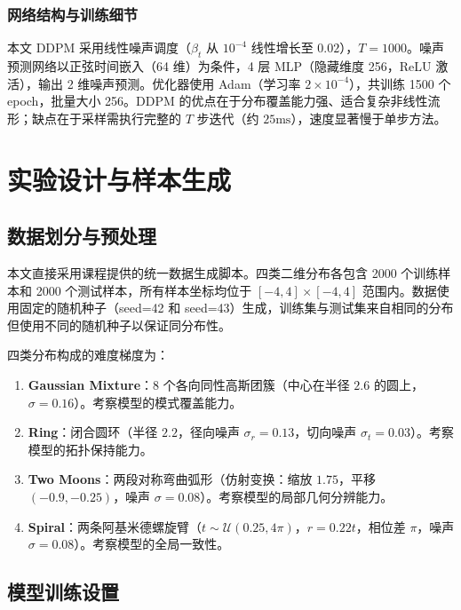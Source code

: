 \documentclass[10pt, a4paper, oneside]{ctexart}
\numberwithin{equation}{section}
\numberwithin{table}{section}
\numberwithin{figure}{section}
\begin{document}
\subsubsection{网络结构与训练细节}

本文 DDPM 采用线性噪声调度（$\beta_t$ 从 $10^{-4}$ 线性增长至 $0.02$），$T=1000$。噪声预测网络以正弦时间嵌入（64 维）为条件，4 层 MLP（隐藏维度 256，ReLU 激活），输出 2 维噪声预测。优化器使用 Adam（学习率 $2\times 10^{-4}$），共训练 1500 个 epoch，批量大小 256。DDPM 的优点在于分布覆盖能力强、适合复杂非线性流形；缺点在于采样需执行完整的 $T$ 步迭代（约 $25\mathrm{ms}$），速度显著慢于单步方法。

\section{实验设计与样本生成}

\subsection{数据划分与预处理}

本文直接采用课程提供的统一数据生成脚本。四类二维分布各包含 2000 个训练样本和 2000 个测试样本，所有样本坐标均位于 $[-4,4]\times[-4,4]$ 范围内。数据使用固定的随机种子（seed=42 和 seed=43）生成，训练集与测试集来自相同的分布但使用不同的随机种子以保证同分布性。

四类分布构成的难度梯度为：
\begin{enumerate}[label=(\arabic*)]
    \item \textbf{Gaussian Mixture}：8 个各向同性高斯团簇（中心在半径 $2.6$ 的圆上，$\sigma=0.16$）。考察模型的模式覆盖能力。
    \item \textbf{Ring}：闭合圆环（半径 $2.2$，径向噪声 $\sigma_r=0.13$，切向噪声 $\sigma_t=0.03$）。考察模型的拓扑保持能力。
    \item \textbf{Two Moons}：两段对称弯曲弧形（仿射变换：缩放 $1.75$，平移 $(-0.9,-0.25)$，噪声 $\sigma=0.08$）。考察模型的局部几何分辨能力。
    \item \textbf{Spiral}：两条阿基米德螺旋臂（$t\sim\mathcal{U}(0.25,4\pi)$，$r=0.22t$，相位差 $\pi$，噪声 $\sigma=0.08$）。考察模型的全局一致性。
\end{enumerate}

\subsection{模型训练设置}
\end{document}
